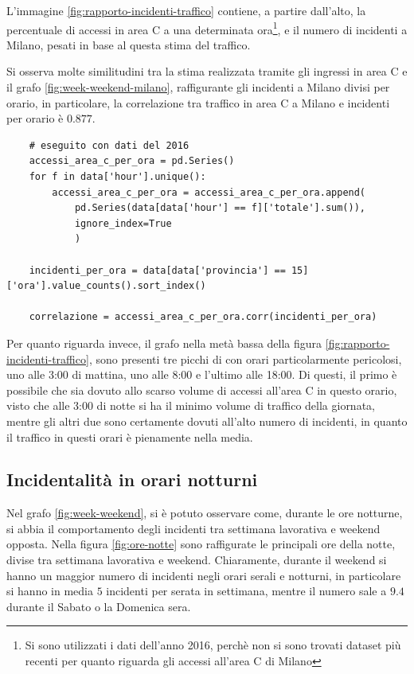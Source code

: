 \documentclass[a4paper]{report}
\begin{document}
L'immagine \ref{fig:rapporto-incidenti-traffico} contiene, a partire dall'alto, 
la percentuale di accessi in area C a una determinata 
ora\footnote{Si sono utilizzati i dati dell'anno 2016, perchè non si sono trovati 
dataset più recenti per quanto riguarda gli accessi all'area C di Milano}, 
e il numero di incidenti a Milano, pesati in base al questa stima del traffico.

Si osserva molte similitudini tra la stima realizzata tramite gli ingressi 
in area C e il grafo \ref{fig:week-weekend-milano}, raffigurante gli incidenti 
a Milano divisi per orario, in particolare, la correlazione tra traffico in 
area C a Milano e incidenti per orario è $0.877$.


\begin{lstlisting}
    # eseguito con dati del 2016
    accessi_area_c_per_ora = pd.Series()
    for f in data['hour'].unique():
        accessi_area_c_per_ora = accessi_area_c_per_ora.append(
            pd.Series(data[data['hour'] == f]['totale'].sum()), 
            ignore_index=True
            )

    incidenti_per_ora = data[data['provincia'] == 15]['ora'].value_counts().sort_index()

    correlazione = accessi_area_c_per_ora.corr(incidenti_per_ora)
\end{lstlisting}

Per quanto riguarda invece, il grafo nella metà bassa della 
figura \ref{fig:rapporto-incidenti-traffico}, sono presenti tre picchi di 
con orari particolarmente pericolosi, uno alle 3:00 di mattina, uno alle 
8:00 e l'ultimo alle 18:00. 
Di questi, il primo è possibile che sia dovuto allo scarso volume di accessi 
all'area C in questo orario, visto che alle 3:00 di notte si ha il minimo volume di 
traffico della giornata, mentre gli altri due sono certamente dovuti all'alto 
numero di incidenti, in quanto il traffico in questi orari è pienamente nella media.

\subsection{Incidentalità in orari notturni}

Nel grafo \ref{fig:week-weekend}, si è potuto osservare come, durante le 
ore notturne, si abbia il comportamento degli incidenti tra settimana lavorativa e weekend opposta.
Nella figura \ref{fig:ore-notte} sono raffigurate le principali ore della notte, divise tra 
settimana lavorativa e weekend.
Chiaramente, durante il weekend si hanno un maggior numero di incidenti negli orari serali e 
notturni, in particolare si hanno in media $5$ incidenti per serata in settimana, mentre il numero 
sale a $9.4$ durante il Sabato o la Domenica sera.
\end{document}
